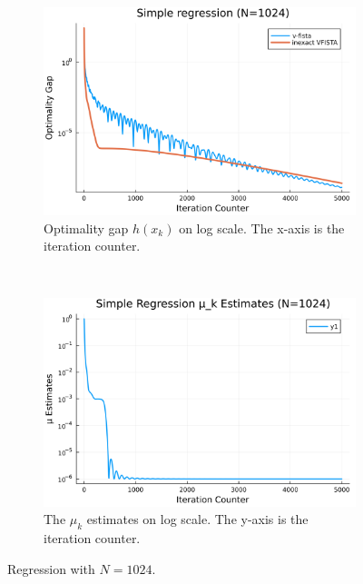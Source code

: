 \documentclass[12pt]{article}
\begin{document}
        \begin{figure}[H]
            \centering
            \begin{subfigure}[b]{0.47\textwidth}
                \centering
                \includegraphics[width=\textwidth]{assets/simple_regression_loss_1024.png}
                \caption{Optimality gap $h(x_k)$ on log scale. The x-axis is the iteration counter. }
                \label{fig:simple-regression-optimality-gap-1024}
            \end{subfigure}
            ~ 
            \begin{subfigure}[b]{0.47\textwidth}
                \centering
                \includegraphics[width=\textwidth]{assets/simple_regression_loss_sc_estimates_1024.png}
                \caption{The $\mu_k$ estimates on log scale. The y-axis is the iteration counter. }
                \label{fig:simple-regression-mu-estimates-1024}
            \end{subfigure}
            \caption{Regression with $N=1024$. }
            \label{fig:simple-regression-1024}
        \end{figure}
       
\end{document}
